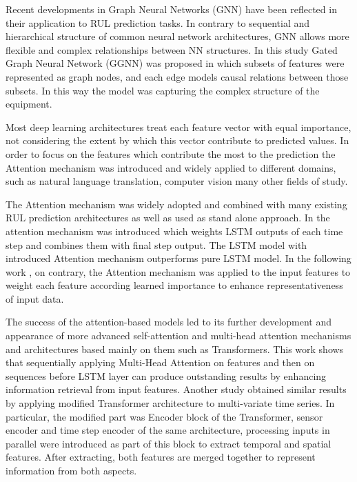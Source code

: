 Recent developments in Graph Neural Networks (GNN) have been reflected in their application to RUL prediction tasks. In contrary to sequential and hierarchical structure of common neural network architectures, GNN allows more flexible and complex relationships between NN structures. In this study \cite{GNMR2020} Gated Graph Neural Network (GGNN) \cite{GatedNN2015} was proposed in which subsets of features were represented as graph nodes, and each edge models causal relations between those subsets. In this way the model was capturing the complex structure of the equipment.  

Most deep learning architectures treat each feature vector with equal importance, not considering the extent by which this vector contribute to predicted values. In order to focus on the features which contribute the most to the prediction the Attention mechanism was introduced and widely applied to different domains, such as natural language translation, computer vision many other fields of study.  

The Attention mechanism was widely adopted and combined with many existing RUL prediction architectures as well as used as stand alone approach. In  \cite{RNNATN2019} the attention mechanism was introduced which weights LSTM outputs of each time step and combines them with final step output. The LSTM model with introduced Attention mechanism outperforms pure LSTM model. In the following work \cite{AGCNN2021}, on contrary, the Attention mechanism was applied to the input features to weight each feature according learned importance to enhance representativeness of input data.

The success of the attention-based models led to its further development and appearance of more advanced self-attention and multi-head attention mechanisms and architectures based mainly on them such as Transformers.  This work \cite{MDSA2022} shows that sequentially applying Multi-Head Attention on features and then on sequences before LSTM layer can produce outstanding results by enhancing information retrieval from input features.  Another study \cite{Zhang2022} obtained similar results by applying modified Transformer architecture to multi-variate time series.  In particular, the modified part was Encoder block of the Transformer, sensor encoder and time step encoder of the same architecture, processing inputs in parallel were introduced as part of this block to extract temporal and spatial features. After extracting, both features are merged together to represent information from both aspects.

